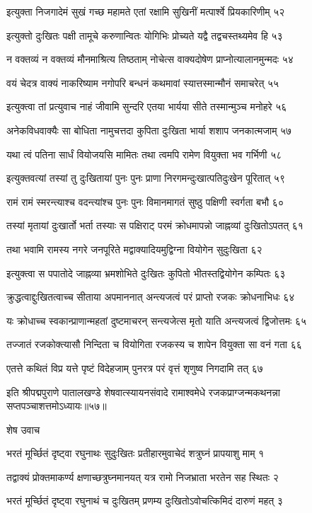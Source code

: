 इत्युक्ता निजगादेमं सुखं गच्छ महामते
एतां रक्षामि सुखिनीं मत्पार्श्वे प्रियकारिणीम् ५२

इत्युक्तो दुःखितः पक्षी तामूचे करुणान्वितः
योगिभिः प्रोच्यते यद्वै तद्वचस्तथ्यमेव हि ५३

न वक्तव्यं न वक्तव्यं मौनमाश्रित्य तिष्ठताम्
नोचेत्स वाक्यदोषेण प्राप्नोत्यालानमुन्मदः ५४

वयं चेदत्र वाक्यं नाकरिष्याम नगोपरि
बन्धनं कथमावां स्यात्तस्मान्मौनं समाचरेत् ५५

इत्युक्त्वा तां प्रत्युवाच नाहं जीवामि सुन्दरि
एतया भार्यया सीते तस्मान्मुञ्च मनोहरे ५६

अनेकविधवाक्यैः सा बोधिता नामुचत्तदा
कुपिता दुःखिता भार्या शशाप जनकात्मजाम् ५७

यथा त्वं पतिना सार्धं वियोजयसि मामितः
तथा त्वमपि रामेण वियुक्ता भव गर्भिणी ५८

इत्युक्तवत्यां तस्यां तु दुःखितायां पुनः पुनः
प्राणा निरगमन्दुःखात्पतिदुःखेन पूरितात् ५९

रामं रामं स्मरन्त्याश्च वदन्त्यांश्च पुनः पुनः
विमानमागतं सुष्ठु पक्षिणी स्वर्गता बभौ ६०

तस्यां मृतायां दुःखार्तो भर्ता तस्याः स पक्षिराट्
परमं क्रोधमापन्नो जाह्नव्यां दुःखितोऽपतत् ६१

तथा भवामि रामस्य नगरे जनपूरिते
मद्वाक्यादियमुद्विग्ना वियोगेन सुदुःखिता ६२

इत्युक्त्वा स पपातोदे जाह्नव्या भ्रमशोभिते
दुःखितः कुपितो भीतस्तद्वियोगेन कम्पितः ६३

क्रुद्धत्वाद्दुःखितत्वाच्च सीताया अपमाननात्
अन्त्यजत्वं परं प्राप्तो रजकः क्रोधनाभिधः ६४

यः क्रोधाच्च स्वकान्प्राणान्महतां दुष्टमाचरन्
सन्त्यजेत्स मृतो याति अन्त्यजत्वं द्विजोत्तमः ६५

तज्जातं रजकोक्त्यासौ निन्दिता च वियोगिता
रजकस्य च शापेन वियुक्ता सा वनं गता ६६

एतत्ते कथितं विप्र यत्ते पृष्टं विदेहजाम्
पुनरत्र परं वृत्तं शृणुष्व निगदामि तत् ६७


इति श्रीपद्मपुराणे पातालखण्डे शेषवात्स्यायनसंवादे रामाश्वमेधे रजकप्राग्जन्मकथनन्ना सप्तपञ्चाशत्तमोऽध्यायः॥५७॥


शेष उवाच

भरतं मूर्च्छितं दृष्ट्वा रघुनाथः सुदुःखितः
प्रतीहारमुवाचेदं शत्रुघ्नं प्रापयाशु माम् १

तद्वाक्यं प्रोक्तमाकर्ण्य क्षणाच्छत्रुघ्नमानयत्
यत्र रामो निजभ्राता भरतेन सह स्थितः २

भरतं मूर्च्छितं दृष्ट्वा रघुनाथं च दुःखितम्
प्रणम्य दुःखितोऽवोचत्किमिदं दारुणं महत् ३

